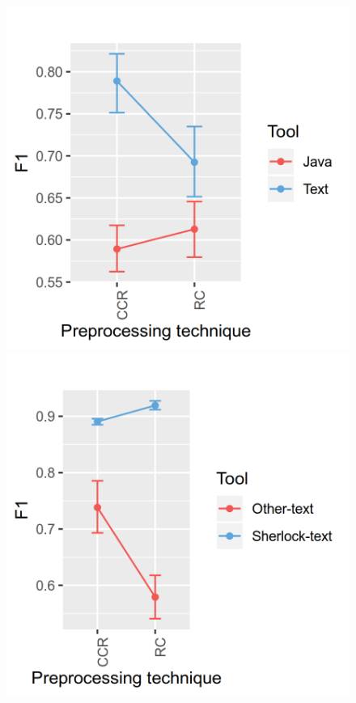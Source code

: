 \documentclass[a4paper, 12pt, oneside, openany, final, pdftex]{book}\usepackage[]{graphicx}\usepackage[]{color}
\makeatletter
\def\maxwidth{ %
  \ifdim\Gin@nat@width>\linewidth
    \linewidth
  \else
    \Gin@nat@width
  \fi
}
\makeatother
\begin{document}
\begin{appendices}
\begin{figure}[ht]
\label{fig:interaction- 10 for SOCO D1 }\endminipage\hfill {} 
\includegraphics[width=\maxwidth]{figure/Figure-SOCO-INTERACTION-11} 
\label{fig:interaction- 11 for SOCO D1 }\endminipage\hfill {} 
\includegraphics[width=\maxwidth]{figure/Figure-SOCO-INTERACTION-12} 

\end{figure}
\end{appendices}
\end{document}
